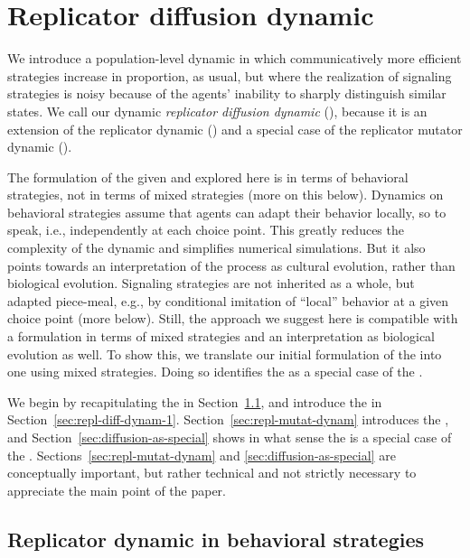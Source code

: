 \documentclass[fleqn,reqno,10pt]{article}
\newcommand{\rd}{\acro{rd}} %
\newcommand{\rmd}{\acro{rmd}} %
\newcommand{\rdd}{\acro{rdd}} %
\begin{document}

\section{Replicator diffusion dynamic}
\label{sec:repl-diff-dynam}

We introduce a population-level dynamic in which communicatively more
efficient strategies increase in proportion, as usual, but where the
realization of signaling strategies is noisy because of the agents'
inability to sharply distinguish similar states. We call our dynamic
\emph{replicator diffusion dynamic} (\rdd), because it is an extension
of the replicator dynamic (\rd) and a special case of the replicator
mutator dynamic (\rmd).

The formulation of the \rdd given and explored here is in terms of
behavioral strategies, not in terms of mixed strategies (more on this
below). Dynamics on behavioral strategies assume that agents can adapt
their behavior locally, so to speak, i.e., independently at each
choice point. This greatly reduces the complexity of the dynamic and
simplifies numerical simulations. But it also points towards an
interpretation of the process as cultural evolution, rather than
biological evolution. Signaling strategies are not inherited as a
whole, but adapted piece-meal, e.g., by conditional imitation of
``local'' behavior at a given choice point (more below). Still, the
approach we suggest here is compatible with a formulation in terms of
mixed strategies and an interpretation as biological evolution as
well. To show this, we translate our initial formulation of the \rdd
into one using mixed strategies. Doing so identifies the \rdd as a
special case of the \rmd.

We begin by recapitulating the \rd in
Section~\ref{sec:repl-dynam-behav}, and introduce the \rdd in
Section~\ref{sec:repl-diff-dynam-1}.
Section~\ref{sec:repl-mutat-dynam} introduces the \rmd, and
Section~\ref{sec:diffusion-as-special} shows in what sense the \rdd is
a special case of the \rmd. Sections~\ref{sec:repl-mutat-dynam} and
\ref{sec:diffusion-as-special} are conceptually important, but rather
technical and not strictly necessary to appreciate the main point of
the paper.

\subsection{Replicator dynamic in behavioral strategies}
\label{sec:repl-dynam-behav}
\end{document}
